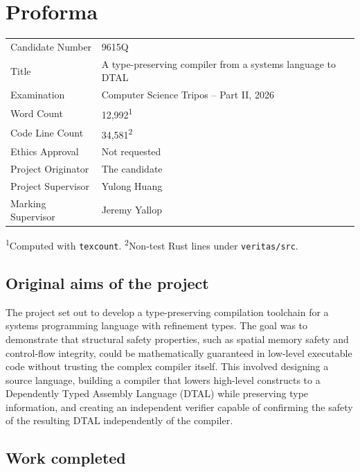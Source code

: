 \section*{Proforma}
\begin{tabular}{ll}
  Candidate Number   & 9615Q                                                      \\
  Title              & A type-preserving compiler from a systems language to DTAL \\
  Examination        & Computer Science Tripos -- Part II, 2026                   \\
  Word Count         & 12,992\textsuperscript{1}
  \\
  Code Line Count    & 34,581\textsuperscript{2}
  \\
  Ethics Approval    & Not requested
  \\
  Project Originator & The candidate                                              \\
  Project Supervisor & Yulong Huang                                               \\
  Marking Supervisor & Jeremy Yallop
\end{tabular}

\smallskip
\noindent\textsuperscript{1}Computed with \texttt{texcount}. \textsuperscript{2}Non-test Rust lines under \texttt{veritas/src}.

\subsection*{Original aims of the project}

The project set out to develop a type-preserving compilation toolchain for a systems programming language with refinement types. The goal was to demonstrate that structural safety properties, such as spatial memory safety and control-flow integrity, could be mathematically guaranteed in low-level executable code without trusting the complex compiler itself. This involved designing a source language, building a compiler that lowers high-level constructs to a Dependently Typed Assembly Language (DTAL) while preserving type information, and creating an independent verifier capable of confirming the safety of the resulting DTAL independently of the compiler.

\subsection*{Work completed}

